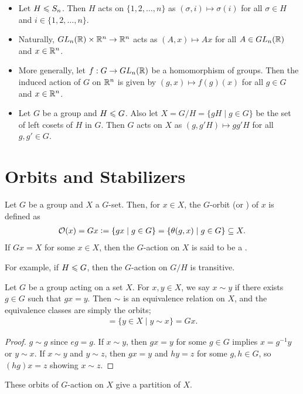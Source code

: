 \begin{example}
    \begin{itemize}
        \item Let $H \leqslant S_{n}$. Then $H$ acts on $\{1,2,\ldots,n\}$ as $(\sigma,i) \mapsto \sigma(i)$ for all $\sigma \in H$ and $i \in \{1,2,\ldots,n\}$.
        \item Naturally, $GL_{n}(\mathbb{R}) \times \mathbb{R}^{n} \to \mathbb{R}^{n}$ acts as $(A,x) \mapsto Ax$ for all $A \in GL_{n}(\mathbb{R})$ and $x \in \mathbb{R}^{n}$.
        \item More generally, let $f:G \to GL_{n}(\mathbb{R})$ be a homomorphism of groups. Then the induced action of $G$ on $\mathbb{R}^{n}$ is given by $(g,x) \mapsto f(g)(x)$ for all $g \in G$ and $x \in \mathbb{R}^{n}$.
        \item Let $G$ be a group and $H \leqslant G$. Also let $X = G/H = \{gH \mid g \in G\}$ be the set of left cosets of $H$ in $G$. Then $G$ acts on $X$ as $(g,g'H) \mapsto gg'H$ for all $g,g' \in G$. 
    \end{itemize}
\end{example}

\section{Orbits and Stabilizers}

\begin{definition}
    Let $G$ be a group and $X$ a $G$-set. Then, for $x \in X$, the $G$-orbit (or ) of $x$ is defined as
    \begin{align}
        \mathcal{O}(x) = Gx \vcentcolon= \{gx \mid g \in G\} = \{\theta(g,x) \mid g \in G\} \subseteq X.
    \end{align}
    If $Gx = X$ for some $x \in X$, then the $G$-action on $X$ is said to be a .
\end{definition}

For example, if $H \leqslant G$, then the $G$-action on $G/H$ is transitive.

\begin{proposition}
    Let $G$ be a group acting on a set $X$. For $x,y \in X$, we say $x \sim y$ if there exists $g \in G$ such that $gx = y$. Then $\sim$ is an equivalence relation on $X$, and the equivalence classes are simply the orbits;
    \begin{align}
        [x] = \{y \in X \mid y \sim x\} = Gx.
    \end{align}
\end{proposition}
\begin{proof}
    $g \sim g$ since $eg = g$. If $x \sim y$, then $gx = y$ for some $g \in G$ implies $x = g^{-1}y$ or $y \sim x$. If $x \sim y$ and $y \sim z$, then $gx = y$ and $hy = z$ for some $g,h \in G$, so $(hg)x = z$ showing $x \sim z$.
\end{proof}
These orbits of $G$-action on $X$ give a partition of $X$.

